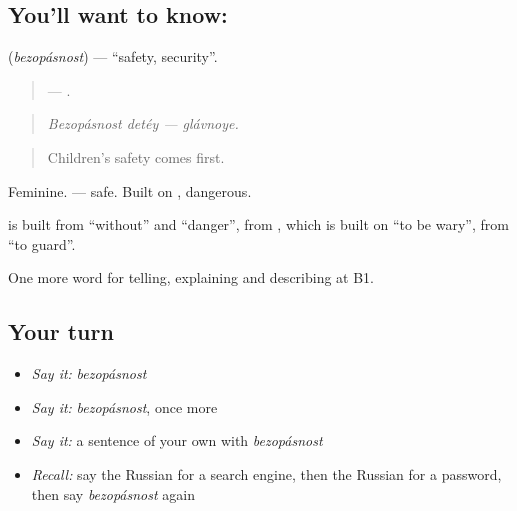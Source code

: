 \subsection*{You'll want to know: }
\textbf{} (\emph{bezopásnost}) — \textquotedblleft{}safety, security\textquotedblright{}.

\begin{quote}
  — .
\end{quote}

\begin{quote}
\emph{Bezopásnost detéy — glávnoye.}
\end{quote}

\begin{quote}
Children’s safety comes first.
\end{quote}

Feminine. \emph{ } — safe. Built on \emph{}, dangerous.

\begin{cousinweb}
\textbf{} is built from \emph{} \textquotedblleft{}without\textquotedblright{} and \emph{} \textquotedblleft{}danger\textquotedblright{}, from \emph{}, which is built on \emph{} \textquotedblleft{}to be wary\textquotedblright{}, from \emph{} \textquotedblleft{}to guard\textquotedblright{}.
\end{cousinweb}

\begin{grammarlens}[title={What you've built}]
One more word for telling, explaining and describing at B1.
\end{grammarlens}

\subsection*{Your turn}
\begin{itemize}
\raggedright
  \item \emph{Say it:} \emph{bezopásnost}
  \item \emph{Say it:} \emph{bezopásnost}, once more
  \item \emph{Say it:} a sentence of your own with \emph{bezopásnost}
  \item \emph{Recall:} say the Russian for a search engine, then the Russian for a password, then say \emph{bezopásnost} again
\end{itemize}

